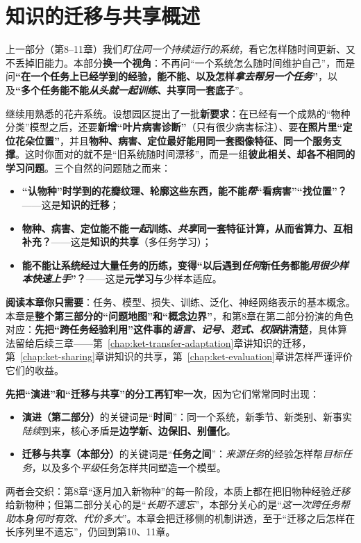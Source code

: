 \chapter{知识的迁移与共享概述}
\label{chap:kts-overview}

上一部分（第8–11章）我们\emph{盯住同一个持续运行的系统}，看它怎样随时间更新、又不丢掉旧能力。本部分\textbf{换一个视角}：不再问“一个系统怎么随时间维护自己”，而是问\textbf{“在一个任务上已经学到的经验，能不能、以及怎样\emph{拿去帮另一个任务}”}，以及\textbf{“多个任务能不能\emph{从头就一起训练}、共享同一套底子}”。

继续用熟悉的花卉系统。设想园区提出了一批\textbf{新要求}：在已经有一个成熟的“物种分类”模型之后，还要\textbf{新增“叶片病害诊断”}（只有很少病害标注）、要\textbf{在照片里“定位花朵位置”}，并且\textbf{物种、病害、定位最好能用同一套图像特征、同一个服务支撑}。这时你面对的就不是“旧系统随时间漂移”，而是一组\textbf{彼此相关、却各不相同的学习问题}。三个自然的问题随之而来：
\begin{itemize}\item \textbf{“认物种”时学到的花瓣纹理、轮廓这些东西，能不能\emph{帮}“看病害”“找位置”？}——这是\textbf{知识的迁移}；\item \textbf{物种、病害、定位能不能\emph{一起}训练、\emph{共享}同一套特征计算，从而省算力、互相补充？}——这是\textbf{知识的共享}（多任务学习）；\item \textbf{能不能让系统经过大量任务的历练，变得“以后遇到\emph{任何}新任务都能\emph{用很少样本快速上手}”？}——这是\textbf{元学习}与少样本适应。\end{itemize}

\textbf{阅读本章你只需要}：任务、模型、损失、训练、泛化、神经网络表示的基本概念。本章是\textbf{整个第三部分的“问题地图”和“概念边界”}，和第8章在第二部分扮演的角色对应：\textbf{先把“跨任务经验利用”这件事的\emph{语言、记号、范式、权限}讲清楚}，具体算法留给后续三章——第~\ref{chap:ket-transfer-adaptation}章讲知识的迁移，第~\ref{chap:ket-sharing}章讲知识的共享，第~\ref{chap:ket-evaluation}章讲怎样严谨评价它们的收益。

\textbf{先把“演进”和“迁移与共享”的分工再钉牢一次}，因为它们常常同时出现：
\begin{itemize}\item \textbf{演进（第二部分）}的关键词是“\textbf{时间}”：同一个系统，新季节、新类别、新事实\emph{陆续}到来，核心矛盾是\textbf{边学新、边保旧、别僵化}。\item \textbf{迁移与共享（本部分）}的关键词是“\textbf{任务之间}”：\emph{来源任务}的经验怎样帮\emph{目标任务}，以及多个\emph{平级}任务怎样共同塑造一个模型。\end{itemize}
两者会交织：第8章“逐月加入新物种”的每一阶段，本质上都在把旧物种经验\emph{迁移}给新物种；但第二部分关心的是“\emph{长期不遗忘}”，本部分关心的是“\emph{这一次跨任务帮助}本身\emph{何时有效、代价多大}”。本章会把迁移侧的机制讲透，至于“迁移之后怎样在长序列里不遗忘”，仍回到第10、11章。

